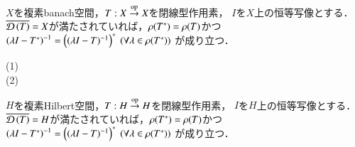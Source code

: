 	
	\begin{screen}
		\begin{thm}[レゾルベントの共役]
			$X$を複素banach空間，$T:X \overset{\mathrm{op}}{\rightarrow} X$を閉線型作用素，
			$I$を$X$上の恒等写像とする．$\closure{\Dom{T} } = X$が満たされていれば，$\mathfrak{\rho} (T^*) = \mathfrak{\rho} (T) $かつ
			$\left( \lambda I - T^* \right)^{-1} = \left((\lambda I - T)^{-1}\right)^*\ (\forall \lambda \in \mathfrak{\rho} (T^*))$
			が成り立つ．
		\end{thm}
	\end{screen}
	
	\begin{prf}\mbox{}
		\begin{description}
			\item[(1)]
				
			\item[(2)]
		\end{description}
	\end{prf}
	
	\begin{screen}
		\begin{thm}[レゾルベントの共役]
			$H$を複素Hilbert空間，$T:H \overset{\mathrm{op}}{\rightarrow} H$を閉線型作用素，
			$I$を$H$上の恒等写像とする．$\closure{\Dom{T} } = H$が満たされていれば，$\mathfrak{\rho} (T^*) = \mathfrak{\rho} (T) $かつ
			$\left( \lambda I - T^* \right)^{-1} = \left((\lambda I - T)^{-1}\right)^*\ (\forall \lambda \in \mathfrak{\rho} (T^*))$
			が成り立つ．
		\end{thm}
	\end{screen}